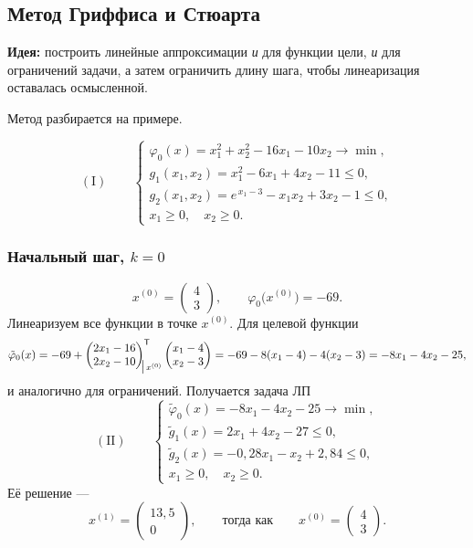\subsection{Метод Гриффиса и Стюарта}
\label{subsec:griffith-stewart}

\textbf{Идея:} построить линейные аппроксимации \emph{и} для функции цели,
\emph{и} для ограничений задачи, а затем ограничить длину шага, чтобы
линеаризация оставалась осмысленной.

Метод разбирается на примере.

\begin{example}\label{ex:griffith}
\[
  (\mathrm{I})
  \qquad
  \begin{cases}
    \varphi_0(x) = x_1^2 + x_2^2 - 16 x_1 - 10 x_2 \to \min , \\[2pt]
    g_1(x_1, x_2) = x_1^2 - 6 x_1 + 4 x_2 - 11 \le 0 , \\[2pt]
    g_2(x_1, x_2) = e^{\,x_1 - 3} - x_1 x_2 + 3 x_2 - 1 \le 0 , \\[2pt]
    x_1 \ge 0 , \quad x_2 \ge 0 .
  \end{cases}
\]
\end{example}

\subsubsection*{Начальный шаг, $k = 0$}

\[
  x^{(0)} = \begin{pmatrix} 4 \\ 3 \end{pmatrix} ,
  \qquad
  \varphi_0\big(x^{(0)}\big) = -69 .
\]
Линеаризуем все функции в точке $x^{(0)}$. Для целевой функции
\[
  \tilde\varphi_0(x) = -69 +
  \begin{pmatrix} 2x_1 - 16 \\ 2x_2 - 10 \end{pmatrix}^{\mathsf{T}}_{\!\!\big|\,x^{(0)}}
  \begin{pmatrix} x_1 - 4 \\ x_2 - 3 \end{pmatrix}
  = -69 - 8(x_1 - 4) - 4(x_2 - 3)
  = -8x_1 - 4x_2 - 25 ,
\]
и аналогично для ограничений. Получается задача ЛП
\[
  (\mathrm{II})
  \qquad
  \begin{cases}
    \tilde\varphi_0(x) = -8x_1 - 4x_2 - 25 \to \min , \\[2pt]
    \tilde g_1(x) = 2x_1 + 4x_2 - 27 \le 0 , \\[2pt]
    \tilde g_2(x) = -0{,}28 x_1 - x_2 + 2{,}84 \le 0 , \\[2pt]
    x_1 \ge 0 , \quad x_2 \ge 0 .
  \end{cases}
\]
Её решение —
\[
  x^{(1)} = \begin{pmatrix} 13{,}5 \\ 0 \end{pmatrix} ,
  \qquad\text{тогда как}\qquad
  x^{(0)} = \begin{pmatrix} 4 \\ 3 \end{pmatrix} .
\]

